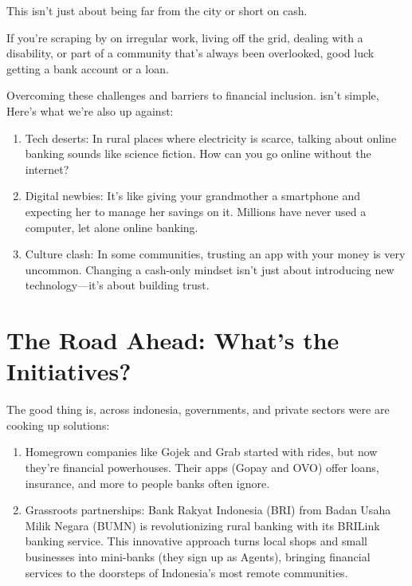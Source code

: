 \documentclass[10pt]{article}
\begin{document}
This isn't just about being far from the city or short on cash.

If you're scraping by on irregular work, living off the grid, dealing with a disability, or part of a community that's always been overlooked, good luck getting a bank account or a loan.

Overcoming these challenges and barriers to financial inclusion. isn't simple, Here's what we're also up against:

\begin{enumerate}
  \item Tech deserts: In rural places where electricity is scarce, talking about online banking sounds like science fiction. How can you go online without the internet?

  \item Digital newbies: It's like giving your grandmother a smartphone and expecting her to manage her savings on it. Millions have never used a computer, let alone online banking.

  \item Culture clash: In some communities, trusting an app with your money is very uncommon. Changing a cash-only mindset isn't just about introducing new technology—it's about building trust.

\end{enumerate}

\section*{The Road Ahead: What's the Initiatives?}
The good thing is, across indonesia, governments, and private sectors were are cooking up solutions:

\begin{enumerate}
  \item Homegrown companies like Gojek and Grab started with rides, but now they're financial powerhouses. Their apps (Gopay and OVO) offer loans, insurance, and more to people banks often ignore.

  \item Grassroots partnerships: Bank Rakyat Indonesia (BRI) from Badan Usaha Milik Negara (BUMN) is revolutionizing rural banking with its BRILink banking service. This innovative approach turns local shops and small businesses into mini-banks (they sign up as Agents), bringing financial services to the doorsteps of Indonesia's most remote communities.

\end{enumerate}
\end{document}
